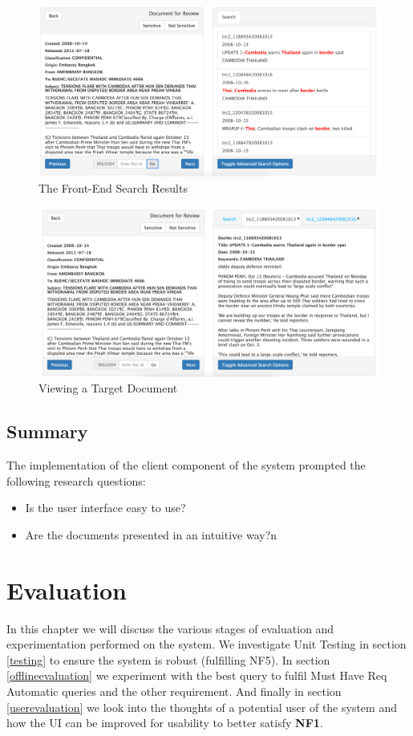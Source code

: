 \documentclass{l4proj}
\begin{document}
\begin{figure}[H]
\centering
\includegraphics[scale=0.30]{images/searchresults}
\caption{The Front-End Search Results}
\label{relevant_results}
\end{figure}
\begin{figure}[H]
\centering
\includegraphics[scale=0.30]{images/targetdocument}
\caption{Viewing a Target Document}
\label{relevant_results}
\end{figure}

\section{Summary} \label{clientsummary}
The implementation of the client component of the system prompted the following research questions:
\begin{itemize}
\item Is the user interface easy to use?
\item Are the documents presented in an intuitive way?n
\end{itemize}

\chapter{Evaluation} \label{evaluation}
In this chapter we will discuss the various stages of evaluation and experimentation performed on the system.
We investigate Unit Testing in section \ref{testing} to ensure the system is robust (fulfilling NF5).
In section \ref{offlineevaluation} we experiment with the best query to fulfil Must Have Req Automatic queries  and the other requirement.
And finally in section \ref{userevaluation} we look into the thoughts of a potential user of the system and how the UI can be improved for usability to better satisfy \textbf{NF1}.
\end{document}
